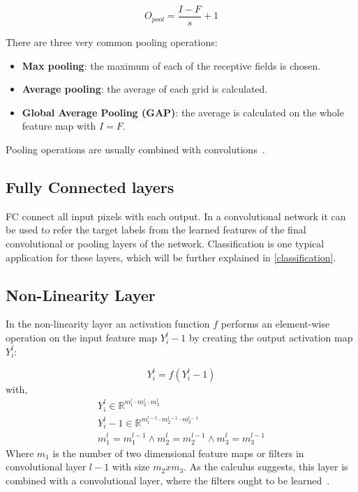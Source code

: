 \begin{equation}
    O_{pool}=\frac{I-F}{s}+1
\end{equation}

There are three very common pooling operations:
\begin{itemize}
    \item \textbf{Max pooling}: the maximum of each of the receptive fields is chosen.
    \item \textbf{Average pooling}: the average of each grid is calculated.
    \item \textbf{Global Average Pooling (GAP)}: the average is calculated on the whole feature map with $I=F$.
\end{itemize}
Pooling operations are usually combined with convolutions~\cite{advanceddeeplearningpython}.

\subsection{Fully Connected layers}
\gls{FC} connect all input pixels with each output.
In a convolutional network it can be used to refer the target labels from the learned features of the final convolutional
or pooling layers of the network.
Classification is one typical application for these layers, which will be further explained in \autoref{classification}.


\subsection{Non-Linearity Layer}
In the non-linearity layer an activation function $f$ performs an element-wise operation on the input feature map
$Y_i^l-1$ by creating the output activation map $Y_i^l$:

\begin{equation}
    Y_i^l=f(Y_i^l-1)
\end{equation}
with,
\begin{align}
    Y_i^l\in\mathbb{R}^{m_1^l\cdot m_2^l\cdot m_3^l} \\
    Y_i^l-1\in\mathbb{R}^{m_1^{l-1}\cdot m_2^{l-1}\cdot m_3^{l-1}} \\
    m_1^l = m_1^{l-1} \land m_2^l = m_2^{l-1} \land m_3^l = m_3^{l-1}
\end{align}
Where $m_1$ is the number of two dimensional feature maps or filters in convolutional layer $l-1$
with size $m_2 x m_3$.
As the calculus suggests, this layer is combined with a convolutional layer, where the filters ought to be
 learned~\cite{wikitumcnn}.

